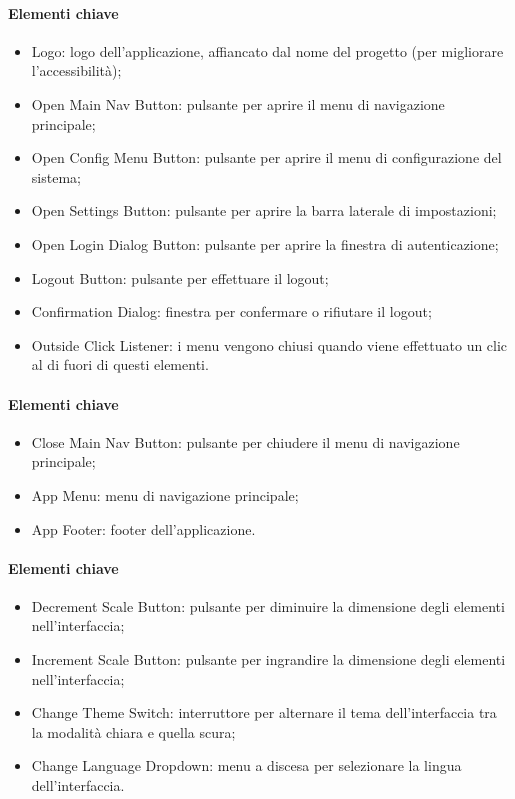 
\paragraph*{Elementi chiave}
\begin{itemize}
  \item Logo: logo dell'applicazione, affiancato dal nome del progetto (per migliorare l'accessibilità);
  \item Open Main Nav Button: pulsante per aprire il menu di navigazione principale;
  \item Open Config Menu Button: pulsante per aprire il menu di configurazione del sistema;
  \item Open Settings Button: pulsante per aprire la barra laterale di impostazioni;
  \item Open Login Dialog Button: pulsante per aprire la finestra di autenticazione;
  \item Logout Button: pulsante per effettuare il logout;
  \item Confirmation Dialog: finestra per confermare o rifiutare il logout;
  \item Outside Click Listener: i menu vengono chiusi quando viene effettuato un clic al di fuori di questi elementi.
\end{itemize}


\paragraph*{Elementi chiave}
\begin{itemize}
  \item Close Main Nav Button: pulsante per chiudere il menu di navigazione principale;
  \item App Menu: menu di navigazione principale;
  \item App Footer: footer dell'applicazione.
\end{itemize}


\paragraph*{Elementi chiave}
\begin{itemize}
  \item Decrement Scale Button: pulsante per diminuire la dimensione degli elementi nell'interfaccia;
  \item Increment Scale Button: pulsante per ingrandire la dimensione degli elementi nell'interfaccia;
  \item Change Theme Switch: interruttore per alternare il tema dell'interfaccia tra la modalità chiara e quella scura;
  \item Change Language Dropdown: menu a discesa per selezionare la lingua dell'interfaccia.
\end{itemize}

